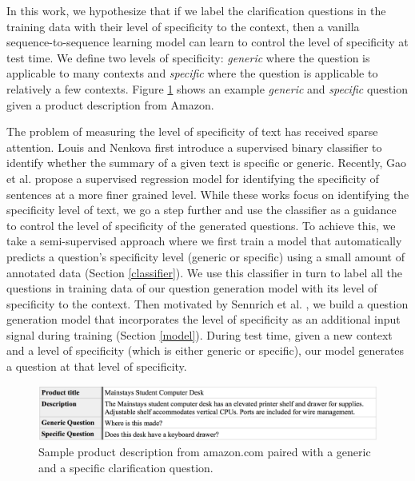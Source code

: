 \documentclass[11pt]{article}
\begin{document}
In this work, we hypothesize that if we label the clarification questions in the training data with their level of specificity to the context, then a vanilla sequence-to-sequence learning model can learn to control the level of specificity at test time. 
We define two levels of specificity: \textit{generic} where the question is applicable to many contexts and \textit{specific} where the question is applicable to relatively a few contexts.
Figure \ref{amazon-ex-1} shows an example \textit{generic} and \textit{specific} question given a product description from Amazon.

The problem of measuring the level of specificity of text has received sparse attention. 
Louis and Nenkova   first introduce a supervised binary classifier to identify whether the summary of a given text is specific or generic. 
Recently, Gao et al.  propose a supervised regression model for identifying the specificity of sentences at a more finer grained level. 
While these works focus on identifying the specificity level of text, we go a step further and use the classifier as a guidance to control the level of specificity of the generated questions. To achieve this, we take a semi-supervised approach where we first train a model that automatically predicts a question's specificity level (generic or specific) using a small amount of annotated data (Section \ref{classifier}). We use this classifier in turn to label all the questions in training data of our question generation model with its level of specificity to the context. 
Then motivated by Sennrich et al. , we build a question generation model that incorporates the level of specificity as an additional input signal during training (Section \ref{model}). 
During test time, given a new context and a level of specificity (which is either generic or specific), our model generates a question at that level of specificity.

\begin{figure}[h]
	\includegraphics[width=\textwidth]{amaz-ex.png}
    \caption{Sample product description from amazon.com paired with a generic and a specific clarification question.}\label{amazon-ex-1}
\end{figure}
\end{document}
